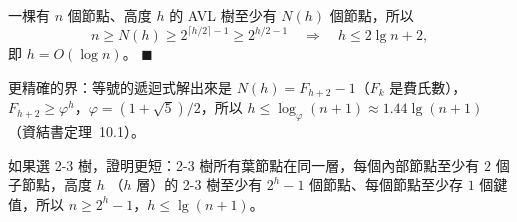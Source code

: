 \begin{pastsoln}
一棵有 $n$ 個節點、高度 $h$ 的 AVL 樹至少有 $N(h)$ 個節點，所以
\[
n \ge N(h) \ge 2^{\lceil h/2 \rceil - 1} \ge 2^{h/2 - 1}
\quad\Longrightarrow\quad h \le 2\lg n + 2 ,
\]
即 $h = O(\log n)$。 \hfill$\blacksquare$

更精確的界：等號的遞迴式解出來是 $N(h) = F_{h+2} - 1$（$F_k$ 是費氏數），$F_{h+2} \ge
\varphi^{h}$，$\varphi = (1 + \sqrt 5)/2$，所以 $h \le \log_{\varphi}(n + 1) \approx 1.44 \lg(n + 1)$
（資結書定理~10.1）。

如果選 2-3 樹，證明更短：2-3 樹所有葉節點在同一層，每個內部節點至少有 $2$ 個子節點，高度 $h$
（$h$ 層）的 2-3 樹至少有 $2^{h} - 1$ 個節點、每個節點至少存 $1$ 個鍵值，所以
$n \ge 2^{h} - 1$，$h \le \lg(n + 1)$。
\end{pastsoln}
